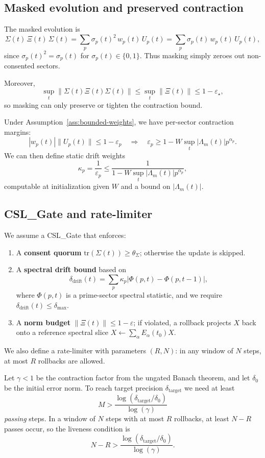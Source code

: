 \documentclass[11pt]{article}
\begin{document}
\subsection{Masked evolution and preserved contraction}

The masked evolution is
\[
\Sigma(t)\, \Xi(t)\, \Sigma(t)
= \sum_p \sigma_p(t)^2\, w_p(t)\, U_p(t)
= \sum_p \sigma_p(t)\, w_p(t)\, U_p(t),
\]
since $\sigma_p(t)^2 = \sigma_p(t)$ for $\sigma_p(t)\in\{0,1\}$. Thus masking
simply zeroes out non-consented sectors.

Moreover,
\[
\sup_t \|\Sigma(t)\Xi(t)\Sigma(t)\|
\le \sup_t \|\Xi(t)\| \le 1 - \varepsilon_\star,
\]
so masking can only preserve or tighten the contraction bound.

Under Assumption~\ref{ass:bounded-weights}, we have per-sector contraction
margins:
\[
|w_p(t)| \|U_p(t)\| \le 1 - \varepsilon_p
\quad\Rightarrow\quad
\varepsilon_p \ge 1 - W \sup_t |\Lambda_m(t)| p^{\alpha_p}.
\]
We can then define static drift weights
\[
\kappa_p = \frac{1}{\varepsilon_p}
\le \frac{1}{1 - W \sup_t|\Lambda_m(t)| p^{\alpha_p}},
\]
computable at initialization given $W$ and a bound on $|\Lambda_m(t)|$.

\subsection{CSL\_Gate and rate-limiter}

We assume a CSL\_Gate that enforces:

\begin{enumerate}
    \item A \textbf{consent quorum} $\mathrm{tr}(\Sigma(t)) \ge \theta_\Sigma$;
    otherwise the update is skipped.
    \item A \textbf{spectral drift bound} based on
    \[
    \delta_{\mathrm{drift}}(t) = \sum_p \kappa_p |\Phi(p,t) - \Phi(p,t-1)|,
    \]
    where $\Phi(p,t)$ is a prime-sector spectral statistic, and we require
    $\delta_{\mathrm{drift}}(t) \le \delta_{\max}$.
    \item A \textbf{norm budget} $\|\Xi(t)\|\le 1 - \varepsilon$; if violated,
    a rollback projects $X$ back onto a reference spectral slice
    $X \leftarrow \sum_\alpha E_\alpha(t_0) X$.
\end{enumerate}

We also define a rate-limiter with parameters $(R,N)$: in any window of $N$ steps,
at most $R$ rollbacks are allowed.

Let $\gamma<1$ be the contraction factor from the ungated Banach theorem,
and let $\delta_0$ be the initial error norm. To reach target precision
$\delta_{\mathrm{target}}$ we need at least
\[
M > \frac{\log(\delta_{\mathrm{target}}/\delta_0)}{\log(\gamma)}
\]
\emph{passing} steps. In a window of $N$ steps with at most $R$ rollbacks, at
least $N-R$ passes occur, so the liveness condition is
\begin{equation}\label{eq:rate-limiter}
N - R > \frac{\log(\delta_{\mathrm{target}}/\delta_0)}{\log(\gamma)}.
\end{equation}
\end{document}
